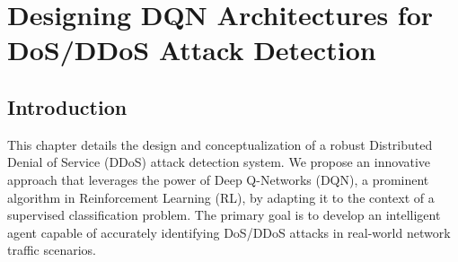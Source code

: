 \documentclass{report}
\begin{document}





\chapter{Designing DQN Architectures for DoS/DDoS Attack Detection}
\section{Introduction}

This chapter details the design and conceptualization of a robust Distributed Denial of Service (DDoS) attack detection system. We propose an innovative approach that leverages the power of Deep Q-Networks (DQN), a prominent algorithm in Reinforcement Learning (RL), by adapting it to the context of a supervised classification problem. The primary goal is to develop an intelligent agent capable of accurately identifying DoS/DDoS attacks in real-world network traffic scenarios.
\end{document}
